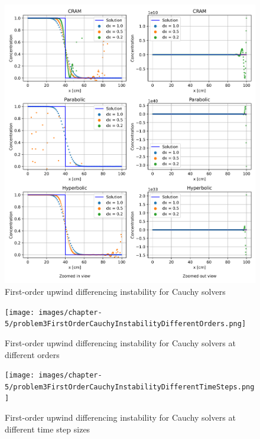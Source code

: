 \clearpage

\begin{figure}[p]
    \centering
    \includegraphics[width=6.0in]{images/chapter-5/problem3FirstOrderCauchyInstability.png}
    \caption{First-order upwind differencing instability for Cauchy solvers}
    \label{fig:first_order_results_cauchy_instability}
\end{figure}

\clearpage

\begin{figure}[p]
    \centering
    \texttt{[image: images/chapter-5/problem3FirstOrderCauchyInstabilityDifferentOrders.png]}
    \caption{First-order upwind differencing instability for Cauchy solvers at different orders}
    \label{fig:first_order_results_cauchy_instability_different_orders}
\end{figure}

\clearpage

\begin{figure}[p]
    \centering
    \texttt{[image: images/chapter-5/problem3FirstOrderCauchyInstabilityDifferentTimeSteps.png]}
    \caption{First-order upwind differencing instability for Cauchy solvers at different time step sizes}
    \label{fig:first_order_results_cauchy_instability_different_time_steps}
\end{figure}

